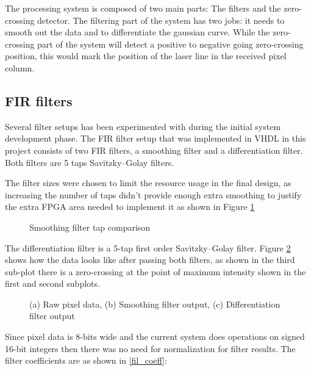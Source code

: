 The processing system is composed of two main parts: The filters and the zero-crossing detector. The filtering part of the system has two jobs: it needs to smooth out the data and to differentiate the gaussian curve. While the zero-crossing part of the system will detect a positive to negative going zero-crossing position, this would mark the position of the laser line in the received pixel column.




\subsection{FIR filters}

Several filter setups has been experimented with during the initial system development phase. The FIR filter setup that was implemented in VHDL in this project consists of two FIR filters, a smoothing filter and a differentiation filter. Both filters are 5 taps Savitzky–Golay filters.

The filter sizes were chosen to limit the resource usage in the final design, as increasing the number of taps didn't provide enough extra smoothing to justify the extra FPGA area needed to implement it as shown in Figure \ref{fig:smoothing_filter_tap_cmp}


\begin{figure}[h]
    \centering
    
    \caption{Smoothing filter tap comparison}
    \label{fig:smoothing_filter_tap_cmp}
\end{figure}


The differentiation filter is a 5-tap first order Savitzky–Golay filter. Figure \ref{fig:data_through_filters} shows how the data looks like after passing both filters, as shown in the third sub-plot there is a zero-crossing at the point of maximum intensity shown in the first and second subplots.

\begin{figure}[h]
    \centering
    
    \caption{(a) Raw pixel data, (b) Smoothing filter output, (c) Differentiation filter output}
    \label{fig:data_through_filters}
\end{figure}

Since pixel data is 8-bits wide and the current system does operations on signed 16-bit integers then there was no need for normalization for filter results. The filter coefficients are as shown in \eqref{fil_coeff}:

